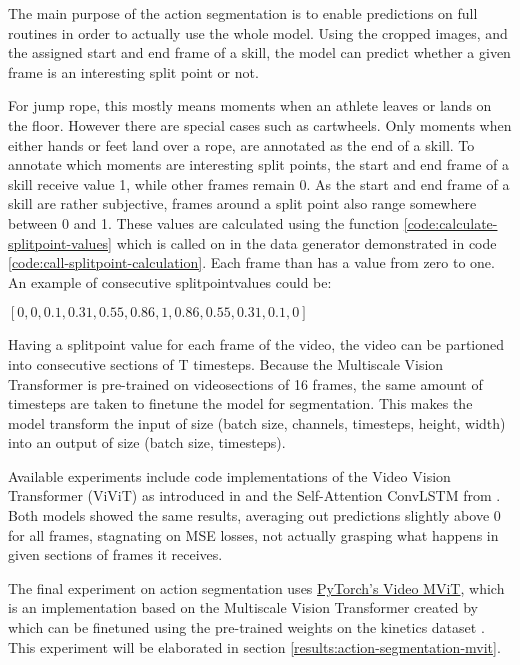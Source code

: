 The main purpose of the action segmentation is to enable predictions on full routines in order to actually use the whole model. Using the cropped images, and the assigned start and end frame of a skill, the model can predict whether a given frame is an interesting split point or not.

For jump rope, this mostly means moments when an athlete leaves or lands on the floor. However there are special cases such as cartwheels. Only moments when either hands or feet land over a rope, are annotated as the end of a skill.
To annotate which moments are interesting split points, the start and end frame of a skill receive value 1, while other frames remain 0.
As the start and end frame of a skill are rather subjective, frames around a split point also range somewhere between 0 and 1. These values are calculated using the function \ref{code:calculate-splitpoint-values} which is called on in the data generator demonstrated in code \ref{code:call-splitpoint-calculation}.
Each frame than has a value from zero to one. An example of consecutive splitpointvalues could be:

\([0, 0, 0.1, 0.31, 0.55, 0.86, 1, 0.86, 0.55, 0.31, 0.1, 0]\)

Having a splitpoint value for each frame of the video, the video can be partioned into consecutive sections of T timesteps. Because the Multiscale Vision Transformer is pre-trained on videosections of 16 frames, the same amount of timesteps are taken to finetune the model for segmentation. This makes the model transform the input of size (batch size, channels, timesteps, height, width) into an output of size (batch size, timesteps).

Available experiments include code implementations of the Video Vision Transformer (ViViT) as introduced in \textcite{Arnab2021} and the Self-Attention ConvLSTM from \textcite{Lin_2020}. Both models showed the same results, averaging out predictions slightly above 0 for all frames, stagnating on MSE losses, not actually grasping what happens in given sections of frames it receives.

The final experiment on action segmentation uses \href{https://pytorch.org/vision/main/models/video_mvit.html}{PyTorch's Video MViT}, which is an implementation based on the Multiscale Vision Transformer created by \textcite{Fan2021} which can be finetuned using the pre-trained weights on the kinetics dataset \autocite{Kay2017}. This experiment will be elaborated in section \ref{results:action-segmentation-mvit}.


